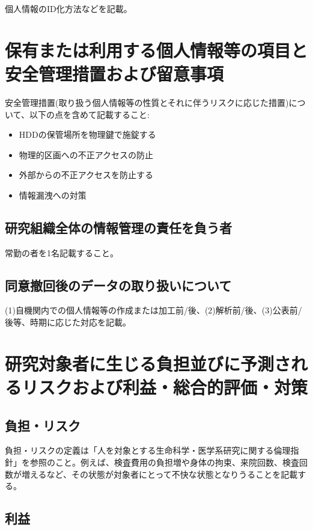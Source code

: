 \documentclass{kyodai-protocol}
\begin{document}
個人情報のID化方法などを記載。

\section{保有または利用する個人情報等の項目と安全管理措置および留意事項}

安全管理措置(取り扱う個人情報等の性質とそれに伴うリスクに応じた措置)について、以下の点を含めて記載すること:
\begin{itemize}
\item HDDの保管場所を物理鍵で施錠する
\item 物理的区画への不正アクセスの防止
\item 外部からの不正アクセスを防止する
\item 情報漏洩への対策
\end{itemize}

\subsection{研究組織全体の情報管理の責任を負う者}

常勤の者を1名記載すること。

\subsection{同意撤回後のデータの取り扱いについて}

(1)自機関内での個人情報等の作成または加工前/後、(2)解析前/後、(3)公表前/後等、時期に応じた対応を記載。

\section{研究対象者に生じる負担並びに予測されるリスクおよび利益・総合的評価・対策}
\label{sec:risk-benefit}

\subsection{負担・リスク}

負担・リスクの定義は「人を対象とする生命科学・医学系研究に関する倫理指針」を参照のこと。例えば、検査費用の負担増や身体の拘束、来院回数、検査回数が増えるなど、その状態が対象者にとって不快な状態となりうることを記載する。

\subsection{利益}
\end{document}
